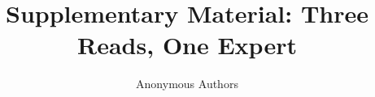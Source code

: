 \documentclass[sigconf,natbib=true,anonymous=true,pbalance=true]{acmart}
\title[Supplementary Material]{Supplementary Material: Three Reads, One Expert}
\author{Anonymous Authors}
\begin{document}
\maketitle
\appendix

\FloatBarrier


\end{document}
